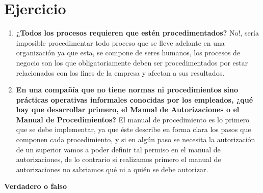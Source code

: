 \documentclass[12pt]{book}
\begin{document}
\section{Ejercicio}
\begin{enumerate}
	\item \textbf{¿Todos los procesos requieren que estén procedimentados?} No!, sería imposible procedimentar todo proceso que se lleve adelante en una organización ya que esta, se compone de seres humanos, los procesos de negocio son los que obligatoriamente deben ser procedimentados por estar relacionados con los fines de la empresa y afectan a sus resultados.
	\item \textbf{En una compañía que no tiene normas ni procedimientos sino prácticas operativas informales
	conocidas por los empleados, ¿qué hay que desarrollar primero, el Manual de Autorizaciones o el
	Manual de Procedimientos?} El manual de procedimiento es lo primero que se debe implementar, ya que éste describe en forma clara los pasos que componen cada procedimiento, y si en algún paso se necesita la autorización de un superior vamos a poder definir tal permiso en el manual de autorizaciones, de lo contrario si realizamos primero el manual de autorizaciones no sabriamos qué ni a quién se debe autorizar.
\end{enumerate}
\textbf{Verdadero o falso}
\end{document}
